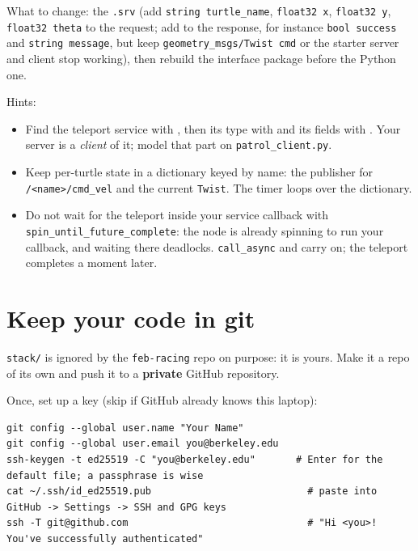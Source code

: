 \documentclass[11pt,a4paper]{article}
\begin{document}
What to change: the \texttt{.srv} (add \texttt{string turtle\_name}, \texttt{float32 x},
\texttt{float32 y}, \texttt{float32 theta} to the request; add to the response, for instance
\texttt{bool success} and \texttt{string message}, but keep \texttt{geometry\_msgs/Twist cmd} or
the starter server and client stop working), then rebuild the interface package before the
Python one.

Hints:
\begin{itemize}
  \item Find the teleport service with , then its type with
   and its fields with .
  Your server is a \emph{client} of it; model that part on \texttt{patrol\_client.py}.
  \item Keep per-turtle state in a dictionary keyed by name: the publisher for
  \texttt{/<name>/cmd\_vel} and the current \texttt{Twist}. The timer loops over the dictionary.
  \item Do not wait for the teleport inside your service callback with
  \texttt{spin\_until\_future\_complete}: the node is already spinning to run your callback, and
  waiting there deadlocks. \texttt{call\_async} and carry on; the teleport completes a moment
  later.
\end{itemize}


\section{Keep your code in git}

\texttt{stack/} is ignored by the \texttt{feb-racing} repo on purpose: it is yours. Make it a
repo of its own and push it to a \textbf{private} GitHub repository.

Once, set up a key (skip if GitHub already knows this laptop):

\begin{lstlisting}
git config --global user.name "Your Name"
git config --global user.email you@berkeley.edu
ssh-keygen -t ed25519 -C "you@berkeley.edu"       # Enter for the default file; a passphrase is wise
cat ~/.ssh/id_ed25519.pub                           # paste into GitHub -> Settings -> SSH and GPG keys
ssh -T git@github.com                               # "Hi <you>! You've successfully authenticated"
\end{lstlisting}
\end{document}
